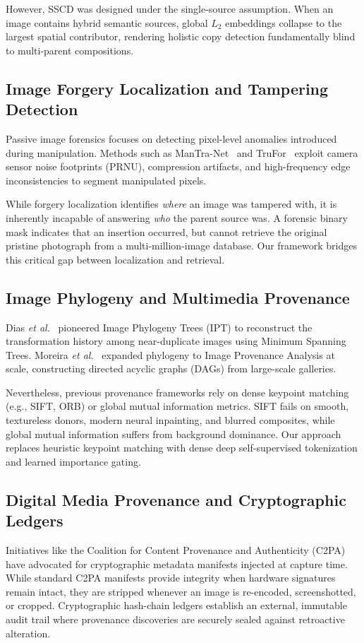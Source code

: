 \documentclass[journal]{IEEEtran}
\begin{document}
However, SSCD was designed under the single-source assumption. When an image contains hybrid semantic sources, global $L_2$ embeddings collapse to the largest spatial contributor, rendering holistic copy detection fundamentally blind to multi-parent compositions.

\subsection{Image Forgery Localization and Tampering Detection}
Passive image forensics focuses on detecting pixel-level anomalies introduced during manipulation. Methods such as ManTra-Net~\cite{Wu2019ManTraNet} and TruFor~\cite{Guillaro2023TruFor} exploit camera sensor noise footprints (PRNU), compression artifacts, and high-frequency edge inconsistencies to segment manipulated pixels. 

While forgery localization identifies \textit{where} an image was tampered with, it is inherently incapable of answering \textit{who} the parent source was. A forensic binary mask indicates that an insertion occurred, but cannot retrieve the original pristine photograph from a multi-million-image database. Our framework bridges this critical gap between localization and retrieval.

\subsection{Image Phylogeny and Multimedia Provenance}
Dias \textit{et al.}~\cite{Dias2012IPT} pioneered Image Phylogeny Trees (IPT) to reconstruct the transformation history among near-duplicate images using Minimum Spanning Trees. Moreira \textit{et al.}~\cite{Moreira2018Provenance} expanded phylogeny to Image Provenance Analysis at scale, constructing directed acyclic graphs (DAGs) from large-scale galleries. 

Nevertheless, previous provenance frameworks rely on dense keypoint matching (e.g., SIFT, ORB) or global mutual information metrics. SIFT fails on smooth, textureless donors, modern neural inpainting, and blurred composites, while global mutual information suffers from background dominance. Our approach replaces heuristic keypoint matching with dense deep self-supervised tokenization and learned importance gating.

\subsection{Digital Media Provenance and Cryptographic Ledgers}
Initiatives like the Coalition for Content Provenance and Authenticity (C2PA)~\cite{C2PA2023} have advocated for cryptographic metadata manifests injected at capture time. While standard C2PA manifests provide integrity when hardware signatures remain intact, they are stripped whenever an image is re-encoded, screenshotted, or cropped. Cryptographic hash-chain ledgers establish an external, immutable audit trail where provenance discoveries are securely sealed against retroactive alteration.
\end{document}
